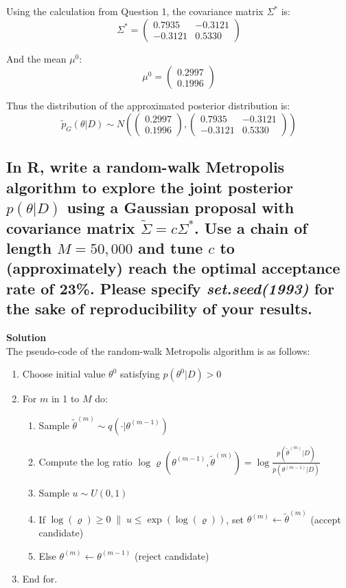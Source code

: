 \documentclass[12pt]{article}
\begin{document}
Using the calculation from Question 1, the covariance matrix \( \Sigma^* \) is:
\[ \Sigma^* =
\begin{pmatrix}
0.7935 & -0.3121 \\
-0.3121 & 0.5330
\end{pmatrix}
\]

And the mean \( \mu^{0} \):
\[ \mu^{0} =
\begin{pmatrix}
0.2997 \\
0.1996
\end{pmatrix}
\]

Thus the distribution of the approximated posterior distribution is:
\[ \tilde{p}_G(\theta|D) \sim N\left(
\begin{pmatrix}
0.2997 \\
0.1996
\end{pmatrix}
,
\begin{pmatrix}
0.7935 & -0.3121 \\
-0.3121 & 0.5330
\end{pmatrix}
\right) \]

\subsection{In R, write a random-walk Metropolis algorithm to explore the joint posterior \( p(\theta|D) \) using a Gaussian proposal with covariance matrix \( \tilde{\Sigma} = c\Sigma^* \). Use a chain of length \( M = 50,000 \) and tune \( c \) to (approximately) reach the optimal acceptance rate of 23\%. Please specify \textit{set.seed(1993)} for the sake of reproducibility of your results.}
\textbf{Solution}\\
The pseudo-code of the random-walk Metropolis algorithm is as follows:
\begin{enumerate}
    \item Choose initial value \( \theta^{0} \) satisfying \( p(\theta^{0}|D) > 0 \)
    \item For \( m \) in 1 to \( M \) do:
    \begin{enumerate}
        \item Sample \( \tilde{\theta}^{(m)} \sim q(\cdot|\theta^{(m-1)}) \)
        \item Compute the log ratio \( \log \varrho(\theta^{(m-1)}, \tilde{\theta}^{(m)}) = \log \frac{p(\tilde{\theta}^{(m)}|D)}{p(\theta^{(m-1)}|D)} \)
        \item Sample \( u \sim U(0, 1) \)
        \item If $\log(\varrho) \geq 0 \; \| \; u \leq \exp(\log(\varrho))$, set $\theta^{(m)} \gets \tilde{\theta}^{(m)}$ (accept candidate)
        \item Else \( \theta^{(m)} \leftarrow \theta^{(m-1)} \) (reject candidate)
    \end{enumerate}
    \item End for.
\end{enumerate}
\end{document}
